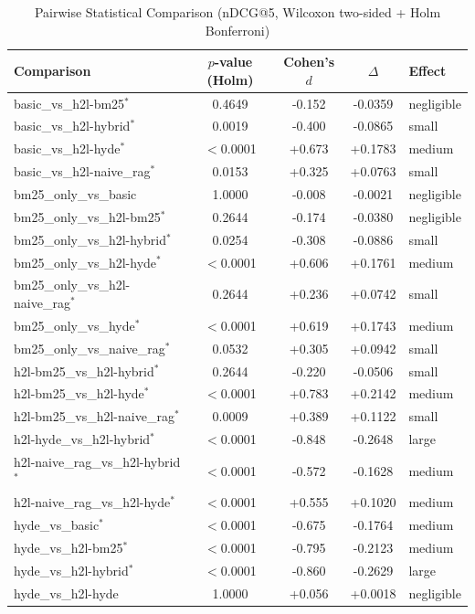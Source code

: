 \begin{table}[t]
\centering
\caption{Pairwise Statistical Comparison (nDCG@5, Wilcoxon two-sided + Holm Bonferroni)}
\label{tab:significance}
\begin{tabular}{lcccl}
\toprule
Comparison & $p$-value (Holm) & Cohen's $d$ & $\Delta$ & Effect \\
\midrule
basic\_vs\_h2l-bm25$^*$ & 0.4649 & -0.152 & -0.0359 & negligible \\
basic\_vs\_h2l-hybrid$^*$ & 0.0019 & -0.400 & -0.0865 & small \\
basic\_vs\_h2l-hyde$^*$ & $<$0.0001 & +0.673 & +0.1783 & medium \\
basic\_vs\_h2l-naive\_rag$^*$ & 0.0153 & +0.325 & +0.0763 & small \\
bm25\_only\_vs\_basic & 1.0000 & -0.008 & -0.0021 & negligible \\
bm25\_only\_vs\_h2l-bm25$^*$ & 0.2644 & -0.174 & -0.0380 & negligible \\
bm25\_only\_vs\_h2l-hybrid$^*$ & 0.0254 & -0.308 & -0.0886 & small \\
bm25\_only\_vs\_h2l-hyde$^*$ & $<$0.0001 & +0.606 & +0.1761 & medium \\
bm25\_only\_vs\_h2l-naive\_rag$^*$ & 0.2644 & +0.236 & +0.0742 & small \\
bm25\_only\_vs\_hyde$^*$ & $<$0.0001 & +0.619 & +0.1743 & medium \\
bm25\_only\_vs\_naive\_rag$^*$ & 0.0532 & +0.305 & +0.0942 & small \\
h2l-bm25\_vs\_h2l-hybrid$^*$ & 0.2644 & -0.220 & -0.0506 & small \\
h2l-bm25\_vs\_h2l-hyde$^*$ & $<$0.0001 & +0.783 & +0.2142 & medium \\
h2l-bm25\_vs\_h2l-naive\_rag$^*$ & 0.0009 & +0.389 & +0.1122 & small \\
h2l-hyde\_vs\_h2l-hybrid$^*$ & $<$0.0001 & -0.848 & -0.2648 & large \\
h2l-naive\_rag\_vs\_h2l-hybrid$^*$ & $<$0.0001 & -0.572 & -0.1628 & medium \\
h2l-naive\_rag\_vs\_h2l-hyde$^*$ & $<$0.0001 & +0.555 & +0.1020 & medium \\
hyde\_vs\_basic$^*$ & $<$0.0001 & -0.675 & -0.1764 & medium \\
hyde\_vs\_h2l-bm25$^*$ & $<$0.0001 & -0.795 & -0.2123 & medium \\
hyde\_vs\_h2l-hybrid$^*$ & $<$0.0001 & -0.860 & -0.2629 & large \\
hyde\_vs\_h2l-hyde & 1.0000 & +0.056 & +0.0018 & negligible \\

\end{tabular}
\end{table}
